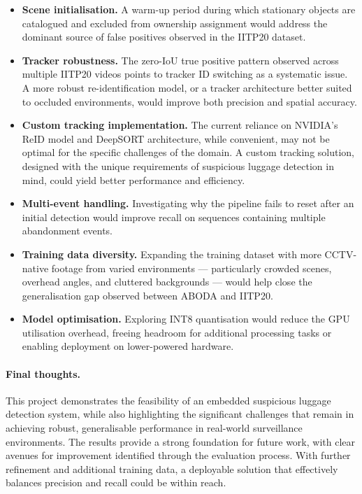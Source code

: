 \begin{itemize}
	\item \textbf{Scene initialisation.} A warm-up period during which stationary
	      objects are catalogued and excluded from ownership assignment would
	      address the dominant source of false positives observed in the IITP20
	      dataset.
	\item \textbf{Tracker robustness.} The zero-IoU true positive pattern
	      observed across multiple IITP20 videos points to tracker ID switching as
	      a systematic issue. A more robust re-identification model, or a tracker
	      architecture better suited to occluded environments, would improve both
	      precision and spatial accuracy.
	\item \textbf{Custom tracking implementation.} The current reliance on NVIDIA's
	      ReID model and DeepSORT architecture, while convenient, may not be optimal for the
	      specific challenges of the domain. A custom tracking solution, designed with the
	      unique requirements of suspicious luggage detection in mind, could yield better
	      performance and efficiency.
	\item \textbf{Multi-event handling.} Investigating why the pipeline fails to
	      reset after an initial detection would improve recall on sequences
	      containing multiple abandonment events.
	\item \textbf{Training data diversity.} Expanding the training dataset with
	      more CCTV-native footage from varied environments --- particularly
	      crowded scenes, overhead angles, and cluttered backgrounds --- would
	      help close the generalisation gap observed between ABODA and IITP20.
	\item \textbf{Model optimisation.} Exploring INT8 quantisation would reduce
	      the GPU utilisation overhead, freeing headroom for additional processing
	      tasks or enabling deployment on lower-powered hardware.
\end{itemize}

\paragraph{Final thoughts.}

This project demonstrates the feasibility of an embedded suspicious luggage
detection system, while also highlighting the significant challenges that
remain in achieving robust, generalisable performance in real-world
surveillance environments. The results provide a strong foundation for future
work, with clear avenues for improvement identified through the evaluation
process. With further refinement and additional training data, a deployable
solution that effectively balances precision and recall could be within reach.

